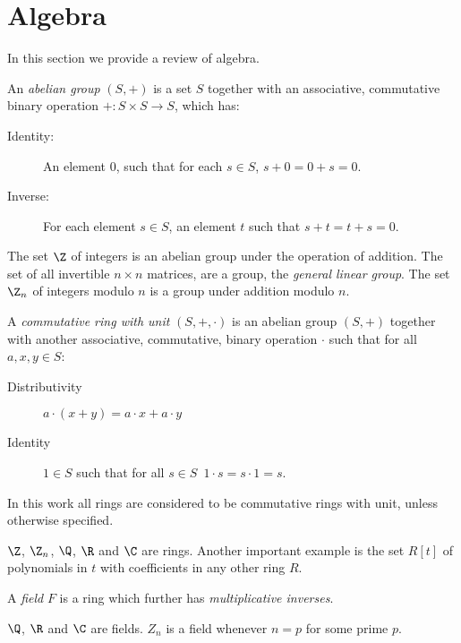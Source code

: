 \section{Algebra}
In this section we provide a review of algebra. 
\begin{definition}
An \emph{abelian group} $(S,+)$ is a set $S$ together with an associative, commutative binary operation $+: S \times S \rightarrow S$, which has:
\begin{description}
\item[Identity:] An element $0$, such that for each $s \in S$, $s+0 = 0+s = 0$.
\item[Inverse:] For each element $s \in S$, an element $t$ such that $s+t = t+s = 0$.
\end{description}
\end{definition}
\begin{example}
The set $\Z$ of integers is an abelian group under the operation of addition. The set of all invertible $n \times n$ matrices, are a group, the \emph{general linear group}.
The set $\Z_n$ of integers modulo $n$ is a group under addition modulo $n$.
\end{example}
\begin{definition}[Ring]
A \emph{commutative ring with unit} $(S,+,\cdot)$ is an abelian group $(S,+)$  together with another associative, commutative, binary operation $\cdot$ such that for all $a,x,y \in S$:
\begin{description}
\item[Distributivity] $a \cdot (x + y)  = a \cdot x + a \cdot y$ 
\item[Identity] $1 \in S$ such that for all $s \in S$\, $1 \cdot s = s \cdot 1 = s$. 
\end{description}
\end{definition}
In this work all rings are considered to be commutative rings with unit, unless otherwise specified.  
\begin{example}
$\Z$, $\Z_n$, $\Q$, $\R$ and $\C$ are rings. Another important example is the set $R[t]$ of polynomials in $t$ with coefficients in any other ring $R$.
\end{example}
\begin{definition}[Field]
A \emph{field} $F$ is a ring which further has \emph{multiplicative inverses}.
\end{definition}
\begin{example}
$\Q$, $\R$ and $\C$ are fields.  $Z_n$ is a field whenever $n = p$ for some prime $p$.
\end{example}
